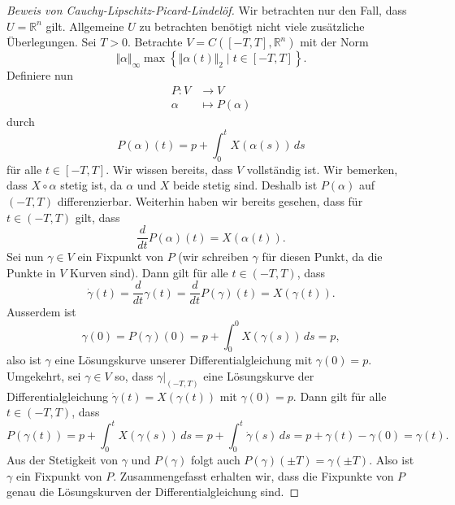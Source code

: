 \documentclass[../main.tex]{subfiles}
\begin{document}
\begin{proof}[Beweis von Cauchy-Lipschitz-Picard-Lindelöf]
  Wir betrachten nur den Fall, dass $U = \mathbb{R}^n$ gilt.
  Allgemeine $U$ zu betrachten benötigt nicht viele zusätzliche
  Überlegungen.
  Sei $T > 0$.
  Betrachte $V = C([-T, T], \mathbb{R}^n)$
  mit der Norm
  \[
    \Vert \alpha \Vert_{\infty} \max \left\{\Vert \alpha(t) \Vert_2
    \mid t \in [-T, T]\right\}.
  \]
  Definiere nun
  \begin{align*}
    P \colon V & \to V \\
    \alpha & \mapsto P(\alpha)
  \end{align*}
  durch
  \[
    P(\alpha)(t) = p + \int_{0}^{t} X(\alpha(s)) \, ds
  \]
  für alle $t \in [-T, T]$.
  Wir wissen bereits, dass $V$ vollständig ist.
  Wir bemerken, dass $X \circ \alpha$ stetig ist,
  da $\alpha$ und $X$ beide stetig sind. Deshalb
  ist $P(\alpha)$ auf $(-T, T)$ differenzierbar.
  Weiterhin haben wir bereits gesehen,
  dass für $t \in (-T, T)$ gilt, dass
  \[
    \frac{d}{dt} P(\alpha)(t) = X(\alpha(t)).
  \]
  Sei nun $\gamma \in V$ ein Fixpunkt von $P$
  (wir schreiben $\gamma$ für diesen Punkt,
  da die Punkte in $V$ Kurven sind).
  Dann gilt für alle $t \in (-T, T)$, dass
  \[
    \dot \gamma(t) = \frac{d}{dt}\gamma(t) =
    \frac{d}{dt} P(\gamma)(t)
    = X(\gamma(t)).
  \]
  Ausserdem ist
  \[
    \gamma(0) = P(\gamma)(0) = p + \int_{0}^{0} X(\gamma(s)) \, ds
    = p,
  \]
  also ist $\gamma$ eine Lösungskurve unserer
  Differentialgleichung mit $\gamma(0) = p$.
  Umgekehrt, sei $\gamma \in V$ so, dass
  $\gamma|_{(-T, T)}$ eine Lösungskurve der Differentialgleichung
  $\dot \gamma(t) = X(\gamma(t))$ mit $\gamma(0) = p$.
  Dann gilt für alle $t \in (-T, T)$,
  dass
  \[
    P(\gamma(t)) = p + \int_{0}^{t} X(\gamma(s)) \, ds
    = p + \int_{0}^{t} \dot \gamma(s) \, ds
    = p + \gamma(t) - \gamma(0)
    = \gamma(t).
  \]
  Aus der Stetigkeit von $\gamma$ und $P(\gamma)$ 
  folgt auch $P(\gamma)(\pm T) = \gamma(\pm T)$.
  Also ist $\gamma$ ein Fixpunkt von $P$.
  Zusammengefasst erhalten wir, dass
  die Fixpunkte von $P$ genau die Lösungskurven
  der Differentialgleichung sind.


\end{proof}
\end{document}
